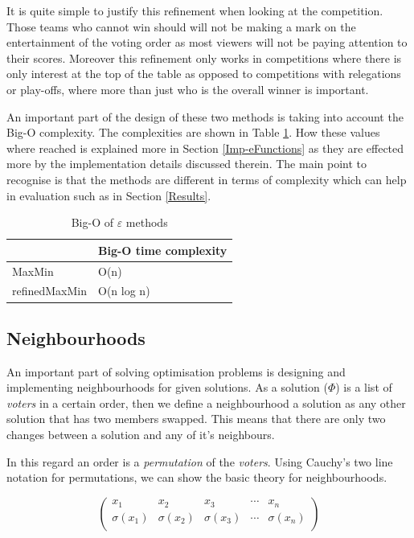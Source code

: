 \documentclass[12pt]{report}
\begin{document}
It is quite simple to justify this refinement when looking at the competition. Those teams who cannot win should will not be making a mark on the entertainment of the voting order as most viewers will not be paying attention to their scores. Moreover this refinement only works in competitions where there is only interest at the top of the table as opposed to competitions with relegations or play-offs, where more than just who is the overall winner is important.

An important part of the design of these two methods is taking into account the Big-O complexity. The complexities are shown in Table \ref{maxMinComp}. How these values where reached is explained more in Section \ref{Imp-eFunctions} as they are effected more by the implementation details discussed therein. The main point to recognise is that the methods are different in terms of complexity which can help in evaluation such as in Section \ref{Results}.

\begin{table}[H]
\centering
\caption{Big-O of $\varepsilon$ methods}
\label{maxMinComp}
\begin{tabular}{|l|l|}
\hline
              & Big-O time complexity \\ \hline
MaxMin        & O(n)                  \\ \hline
refinedMaxMin & O(n log n)               \\ \hline
\end{tabular}
\end{table}

\subsection{Neighbourhoods}\label{Neighbours}
An important part of solving optimisation problems is designing and implementing neighbourhoods for given solutions. As a solution ($\Phi$) is a list of \textit{voters} in a certain order, then we define a neighbourhood a solution as any other solution that has two members swapped. This means that there are only two changes between a solution and any of it's neighbours.

In this regard an order is a \textit{permutation} of the \textit{voters}. Using Cauchy's two line notation for permutations\cite{Cauchy}, we can show the basic theory for neighbourhoods.

\begin{equation}\label{neighbourhood}
\begin{pmatrix}
x_{1} & x_{2} & x_{3} & \cdots & x_{n} \\
\sigma(x_{1}) & \sigma(x_{2}) & \sigma(x_{3}) & \cdots & \sigma(x_{n}) \\
\end{pmatrix}
\end{equation}
\end{document}
